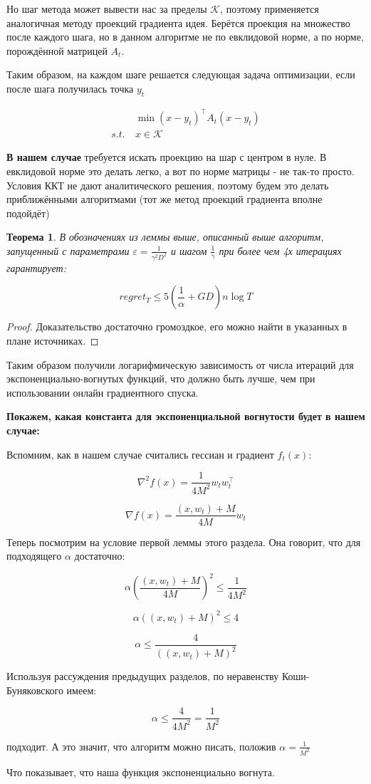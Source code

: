\documentclass[12pt]{article}
\newtheorem*{theorem}{Теорема}
\theoremstyle{definition}
\begin{document}
Но шаг метода может вывести нас за пределы $\mathcal{K}$, поэтому применяется аналогичная методу проекций градиента идея. Берётся проекция на множество после каждого шага, но в данном алгоритме не по евклидовой норме, а по норме, порождённой матрицей $A_t$.

Таким образом, на каждом шаге решается следующая задача оптимизации, если после шага получилась точка $y_t$

\begin{align*}
&\min (x - y_t)^\top A_t(x - y_t) \\
s.t.\ & x \in \mathcal{K}
\end{align*}

\textbf{В нашем случае} требуется искать проекцию на шар с центром в нуле. В евклидовой норме это делать легко, а вот по норме матрицы - не так-то просто. Условия ККТ не дают аналитического решения, поэтому будем это делать приближёнными алгоритмами (тот же метод проекций градиента вполне подойдёт)

\begin{theorem}
В обозначениях из леммы выше, описанный выше алгоритм, запущенный с параметрами $\varepsilon = \frac{1}{\gamma^2 D^2}$ и шагом $\frac{1}{\gamma}$ при более чем 4х итерациях гарантирует:

$$ regret_T \leqslant 5(\frac{1}{\alpha} + GD) n \log T $$
\end{theorem}
	
\begin{proof}
	Доказательство достаточно громоздкое, его можно найти в указанных в плане источниках.
\end{proof}

Таким образом получили логарифмическую зависимость от числа итераций для экспоненциально-вогнутых функций, что должно быть лучше, чем при использовании онлайн градиентного спуска.

\bigskip
\textbf{Покажем, какая константа для экспоненциальной вогнутости будет в нашем случае:}

Вспомним, как в нашем случае считались гессиан и градиент $f_t(x)$:

$$ \nabla^2 f(x) = \frac{1}{4M^2} w_t w_t^\top $$

$$ \nabla f(x) = \frac{(x, w_t) + M}{4M} w_t $$

Теперь посмотрим на условие первой леммы этого раздела. Она говорит, что для подходящего $\alpha$ достаточно:

$$ \alpha \left(\frac{(x, w_t) + M}{4M}\right)^2 \leqslant \frac{1}{4M^2}$$

$$ \alpha ((x, w_t) + M)^2 \leqslant 4 $$

$$ \alpha \leqslant \frac{4}{((x, w_t) + M)^2} $$

Используя рассуждения предыдущих разделов, по неравенству Коши-Буняковского имеем:

$$ \alpha \leqslant \frac{4}{4M^2} = \frac{1}{M^2} $$

подходит. А это значит, что алгоритм можно писать, положив $\alpha = \frac{1}{M^2}$

Что показывает, что наша функция экспоненциально вогнута.
\end{document}
